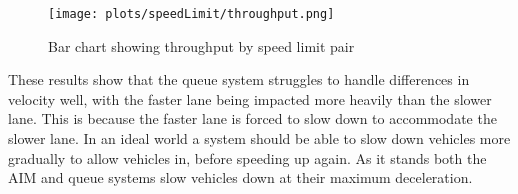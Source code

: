 \begin{figure}[htb]
\texttt{[image: plots/speedLimit/throughput.png]}
\caption{Bar chart showing throughput by speed limit pair}
\label{fig:throughputSpeedLimit}
\end{figure}

These results show that the queue system struggles to handle differences in velocity well, with the faster lane being impacted more heavily than the slower lane. This is because the faster lane is forced to slow down to accommodate the slower lane. In an ideal world a system should be able to slow down vehicles more gradually to allow vehicles in, before speeding up again. As it stands both the AIM and queue systems slow vehicles down at their maximum deceleration.



